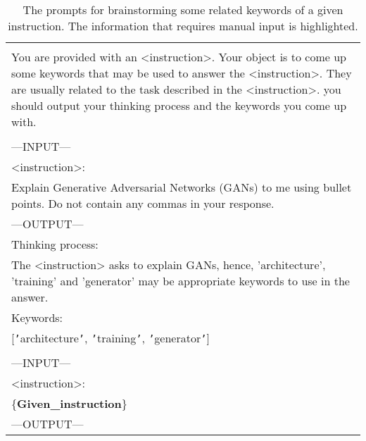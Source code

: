 \begin{table*}[t]
\small
    \begin{tabularx}{\linewidth}{X}
    \toprule
    \color{gray}{/* \textit{Task prompt} */}\\
    You are provided with an <instruction>. Your object is to come up some keywords that may be used to answer the <instruction>. They are usually related to the task described in the <instruction>. you should output your thinking process and the keywords you come up with. \\
    \color{gray}{/* \textit{Example} */}\\
    ---INPUT--- \\
    <instruction>:\\
    Explain Generative Adversarial Networks (GANs) to me using bullet points. Do not contain any commas in your response. \\
    ---OUTPUT---\\
    Thinking process:\\
    The <instruction> asks to explain GANs, hence, 'architecture', 'training' and 'generator' may be appropriate keywords to use in the answer.\\
    Keywords:\\
    \textnormal{[}\texttt{'}architecture\texttt{'}, \texttt{'}training\texttt{'}, \texttt{'}generator\texttt{'}\textnormal{]} \\
    \color{gray}{/* \textit{Input} */}\\
    ---INPUT---\\
    <instruction>:\\
    \{\textbf{Given\_instruction}\}\\
    ---OUTPUT--- \\
    \bottomrule
    \end{tabularx}
  \caption{
    The prompts for brainstorming some related keywords of a given instruction. The information that requires manual input is highlighted.
  }
  \label{tab:100keyword}
\end{table*}

